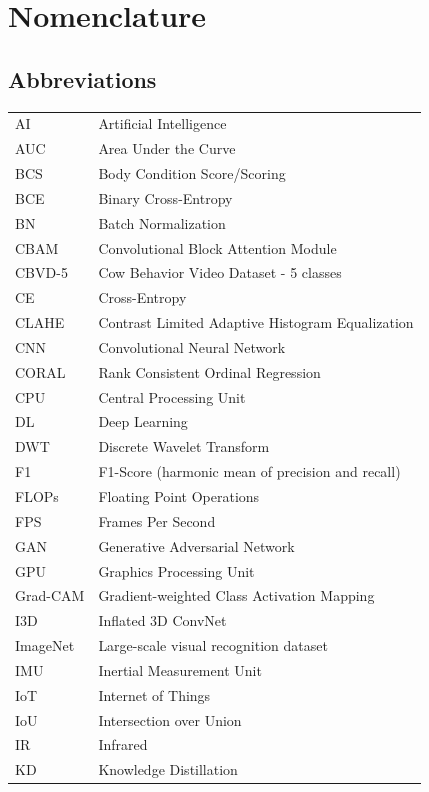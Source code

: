 \chapter*{Nomenclature}

\section*{Abbreviations}

\begin{longtable}{l>{\raggedright\arraybackslash}p{11cm}}
AI & Artificial Intelligence \\
AUC & Area Under the Curve \\
BCS & Body Condition Score/Scoring \\
BCE & Binary Cross-Entropy \\
BN & Batch Normalization \\
CBAM & Convolutional Block Attention Module \\
CBVD-5 & Cow Behavior Video Dataset - 5 classes \\
CE & Cross-Entropy \\
CLAHE & Contrast Limited Adaptive Histogram Equalization \\
CNN & Convolutional Neural Network \\
CORAL & Rank Consistent Ordinal Regression \\
CPU & Central Processing Unit \\
DL & Deep Learning \\
DWT & Discrete Wavelet Transform \\
F1 & F1-Score (harmonic mean of precision and recall) \\
FLOPs & Floating Point Operations \\
FPS & Frames Per Second \\
GAN & Generative Adversarial Network \\
GPU & Graphics Processing Unit \\
Grad-CAM & Gradient-weighted Class Activation Mapping \\
I3D & Inflated 3D ConvNet \\
ImageNet & Large-scale visual recognition dataset \\
IMU & Inertial Measurement Unit \\
IoT & Internet of Things \\
IoU & Intersection over Union \\
IR & Infrared \\
KD & Knowledge Distillation \\

\end{longtable}

